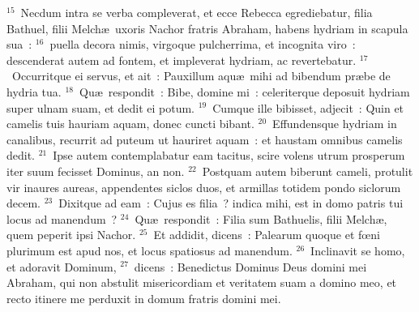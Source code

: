 ${}^{15}$~Necdum intra se verba compleverat, et ecce Rebecca egrediebatur, filia Bathuel, filii Melch\ae\ uxoris Nachor fratris Abraham, habens hydriam in scapula sua~:
${}^{16}$~puella decora nimis, virgoque pulcherrima, et incognita viro~: descenderat autem ad fontem, et impleverat hydriam, ac revertebatur.
${}^{17}$~Occurritque ei servus, et ait~: Pauxillum aqu\ae\ mihi ad bibendum pr\ae be de hydria tua.
${}^{18}$~Qu\ae\ respondit~: Bibe, domine mi~: celeriterque deposuit hydriam super ulnam suam, et dedit ei potum.
${}^{19}$~Cumque ille bibisset, adjecit~: Quin et camelis tuis hauriam aquam, donec cuncti bibant.
${}^{20}$~Effundensque hydriam in canalibus, recurrit ad puteum ut hauriret aquam~: et haustam omnibus camelis dedit.
${}^{21}$~Ipse autem contemplabatur eam tacitus, scire volens utrum prosperum iter suum fecisset Dominus, an non.
${}^{22}$~Postquam autem biberunt cameli, protulit vir inaures aureas, appendentes siclos duos, et armillas totidem pondo siclorum decem.
${}^{23}$~Dixitque ad eam~: Cujus es filia~? indica mihi, est in domo patris tui locus ad manendum~?
${}^{24}$~Qu\ae\ respondit~: Filia sum Bathuelis, filii Melch\ae , quem peperit ipsi Nachor.
${}^{25}$~Et addidit, dicens~: Palearum quoque et fœni plurimum est apud nos, et locus spatiosus ad manendum.
${}^{26}$~Inclinavit se homo, et adoravit Dominum,
${}^{27}$~dicens~: Benedictus Dominus Deus domini mei Abraham, qui non abstulit misericordiam et veritatem suam a domino meo, et recto itinere me perduxit in domum fratris domini mei.


